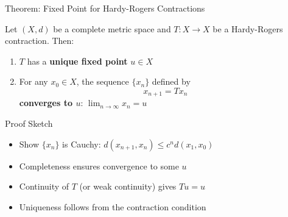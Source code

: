 \documentclass[aspectratio=169,10pt]{beamer}
\begin{document}
\begin{frame}{Theorem: Fixed Point for Hardy-Rogers Contractions}
    \begin{theorem}
        Let $(X, d)$ be a complete metric space and $T : X \to X$ be a
        Hardy-Rogers contraction. Then:

        \begin{enumerate}
            \item $T$ has a \textbf{unique fixed point} $u \in X$
            \item For any $x_0 \in X$, the sequence $\{x_n\}$ defined by
                \begin{equation*}
                    x_{n+1} = Tx_n
                \end{equation*}
                \textbf{converges to $u$}: $\lim_{n \to \infty} x_n = u$
        \end{enumerate}
    \end{theorem}

    \vspace{0.5cm}
    \begin{block}{Proof Sketch}
        \begin{itemize}
            \item Show $\{x_n\}$ is Cauchy: $d(x_{n+1}, x_n) \leq c^n d(x_1, x_0)$
            \item Completeness ensures convergence to some $u$
            \item Continuity of $T$ (or weak continuity) gives $Tu = u$
            \item Uniqueness follows from the contraction condition
        \end{itemize}
    \end{block}
\end{frame}
\end{document}
